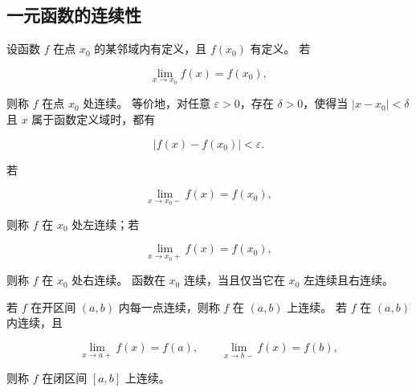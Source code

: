 \documentclass[fontset=fandol]{ctexart}
\begin{document}
\subsection{一元函数的连续性}



\begin{definition}[函数在一点连续]

设函数 $f$ 在点 $x_0$ 的某邻域内有定义，且 $f(x_0)$ 有定义。 若

\[

\lim_{x\to x_0}f(x)=f(x_0),

\]

则称 $f$ 在点 $x_0$ 处连续。 等价地，对任意 $\varepsilon>0$，存在 $\delta>0$，使得当 $|x-x_0|<\delta$ 且 $x$ 属于函数定义域时，都有

\[

|f(x)-f(x_0)|<\varepsilon.

\]

\end{definition}



\begin{definition}[左右连续]

若

\[

\lim_{x\to x_0-}f(x)=f(x_0),

\]

则称 $f$ 在 $x_0$ 处左连续；若

\[

\lim_{x\to x_0+}f(x)=f(x_0),

\]

则称 $f$ 在 $x_0$ 处右连续。 函数在 $x_0$ 连续，当且仅当它在 $x_0$ 左连续且右连续。

\end{definition}



\begin{definition}[区间上的连续]

若 $f$ 在开区间 $(a,b)$ 内每一点连续，则称 $f$ 在 $(a,b)$ 上连续。 若 $f$ 在 $(a,b)$ 内连续，且

\[

\lim_{x\to a+}f(x)=f(a),\qquad \lim_{x\to b-}f(x)=f(b),

\]

则称 $f$ 在闭区间 $[a,b]$ 上连续。

\end{definition}
\end{document}
